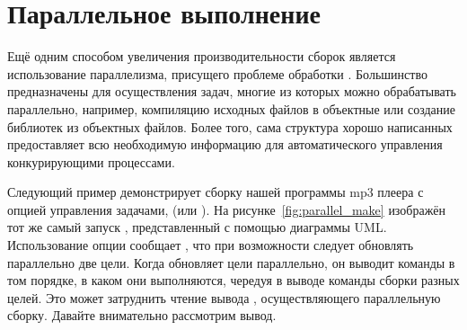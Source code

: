 \section{Параллельное выполнение \GNUmake{}}

Ещё одним способом увеличения производительности сборок является
использование параллелизма, присущего проблеме обработки
. Большинство  предназначены для
осуществления задач, многие из которых можно обрабатывать параллельно,
например, компиляцию исходных файлов \Clang{} в объектные или создание
библиотек из объектных файлов. Более того, сама структура хорошо
написанных  предоставляет всю необходимую информацию для
автоматического управления конкурирующими процессами.

Следующий пример демонстрирует сборку нашей программы mp3 плеера с
опцией управления задачами,  (или ). На рисунке~\ref{fig:parallel_make} изображён тот же самый
запуск \GNUmake{}, представленный с помощью диаграммы
UML. Использование опции  сообщает \GNUmake{}, что
при возможности следует обновлять параллельно две цели. Когда
\GNUmake{} обновляет цели параллельно, он выводит команды в том
порядке, в каком они выполняются, чередуя в выводе команды сборки
разных целей. Это может затруднить чтение вывода \GNUmake{},
осуществляющего параллельную сборку. Давайте внимательно рассмотрим
вывод.

